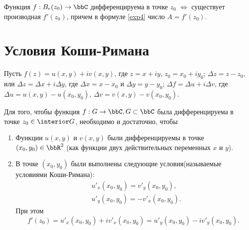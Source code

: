 \begin{lemm}
Функция $f : B_r(z_0) \to \bbC $ дифференцируема в точке $z_0$ $\Longleftrightarrow$ существует производная $f'(z_0)$, причем в формуле \ref{exp4} число $A=f'(z_0)$.
\end{lemm}

\section{Условия Коши-Римана}  
Пусть $f(z)=u(x,y)+iv(x,y)$, где $z=x+iy$, $z_0=x_0+iy_0$; $\Delta z=z-z_0$, или $\Delta z = \Delta x + i\Delta y$, где $\Delta x = x-x_0$ и $\Delta y =y-y_0$; $\Delta f = \Delta u + i\Delta v$, где $\Delta u = u(x,y)-u(x_0,y_0)$,  $\Delta v = v(x,y)-v(x_0,y_0)$. 
\begin{thm} 
Для того, чтобы функция $f: G  \to \bbC,\\G \subset \bbC$ была дифференцируема в точке $z_0\in \interior G$, необходимо и достаточно, чтобы
\begin{enumerate}
\item
Функции $u(x,y)$ и $v(x,y)$ были дифференцируемы в точке $(x_0,y_0) \in \bbR^2$ (как функции двух действительных переменных $x$ и $y$).
\item
В точке  $(x_0,y_0)$ были выполнены следующие условия(называемые условиями Коши-Римана):
\begin{equation}
\label{exp17}
\begin{split}
&u'_x(x_0,y_0) = v'_y(x_0,y_0), \\ &u'_y(x_0,y_0) = -v'_x(x_0,y_0).
\end{split}
\end{equation}
При этом
\begin{equation}
\label{exp8}
f'(z_0) = u'_x(x_0,y_0) + iv'_x(x_0,y_0)= u'_y(x_0,y_0) -iv'_y(x_0,y_0).
\end{equation}
\end{enumerate}
\end{thm}
